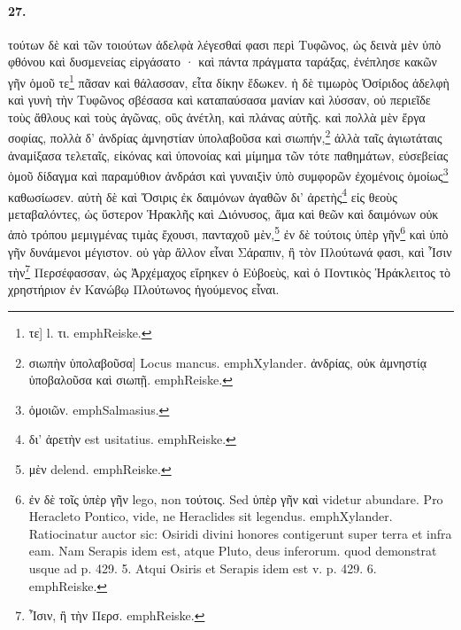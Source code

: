 \documentclass[a4paper, 11pt, oneside, polutonikogreek, german]{article}
\begin{document}
\paragraph{27.}
τούτων δὲ καὶ τῶν τοιούτων ἀδελφὰ λέγεσθαί φασι περὶ Τυφῶνος, ὡς δεινὰ μὲν ὑπὸ φθόνου καὶ δυσμενείας εἰργάσατο · καὶ πάντα πράγματα ταράξας, ἐνέπλησε κακῶν γῆν ὁμοῦ τε\footnote{τε] l. τι. emph{Reiske.}} πᾶσαν καὶ θάλασσαν, εἶτα δίκην ἔδωκεν. ἡ δὲ τιμωρὸς Ὀσίριδος ἀδελφὴ καὶ γυνὴ τὴν Τυφῶνος σβέσασα καὶ καταπαύσασα μανίαν καὶ λύσσαν, οὐ περιεῖδε τοὺς ἄθλους καὶ τοὺς ἀγῶνας, οὓς ἀνέτλη, καὶ πλάνας αὑτῆς. καὶ πολλὰ μὲν ἔργα σοφίας, πολλὰ δ' ἀνδρίας ἀμνηστίαν ὑπολαβοῦσα καὶ σιωπήν,\footnote{σιωπὴν ὑπολαβοῦσα] Locus mancus. emph{Xylander.} ἀνδρίας, οὐκ ἀμνηστίᾳ ὑποβαλοῦσα καὶ σιωπῇ. emph{Reiske.}} ἀλλὰ ταῖς ἁγιωτάταις ἀναμίξασα τελεταῖς, εἰκόνας καὶ ὑπονοίας καὶ μίμημα τῶν τότε παθημάτων, εὐσεβείας ὁμοῦ δίδαγμα καὶ παραμύθιον ἀνδράσι καὶ γυναιξὶν ὑπὸ συμφορῶν ἐχομένοις ὁμοίως\footnote{ὁμοιῶν. emph{Salmasius.}} καθωσίωσεν. αὐτὴ δὲ καὶ Ὄσιρις ἐκ δαιμόνων ἀγαθῶν δι' ἀρετὴς\footnote{δι' ἀρετὴν est usitatius. emph{Reiske.}} εἰς θεοὺς μεταβαλόντες, ὡς ὕστερον Ἡρακλῆς καὶ Διόνυσος, ἅμα καὶ θεῶν καὶ δαιμόνων οὐκ ἀπὸ τρόπου μεμιγμένας τιμὰς ἔχουσι, πανταχοῦ μὲν,\footnote{μὲν delend. emph{Reiske.}} ἐν δὲ τούτοις ὑπὲρ γῆν\footnote{ἐν δὲ τοῖς ὑπὲρ γῆν lego, non τούτοις. Sed ὑπὲρ γῆν καὶ videtur abundare. Pro Heracleto Pontico, vide, ne Heraclides sit legendus. emph{Xylander.} Ratiocinatur auctor sic: Osiridi divini honores contigerunt super terra et infra eam. Nam Serapis idem est, atque Pluto, deus inferorum. quod demonstrat usque ad p. 429. 5. Atqui Osiris et Serapis idem est v. p. 429. 6. emph{Reiske.}} καὶ ὑπὸ γῆν δυνάμενοι μέγιστον. οὐ γὰρ ἄλλον εἶναι Σάραπιν, ἢ τὸν Πλούτωνά φασι, καὶ Ἶσιν τὴν\footnote{Ἶσιν, ἢ τὴν Περσ. emph{Reiske.}} Περσέφασσαν, ὡς Ἀρχέμαχος εἴρηκεν ὁ Εὐβοεὺς, καὶ ὁ Ποντικὸς Ἡράκλειτος τὸ χρηστήριον ἐν Κανώβῳ Πλούτωνος ἡγούμενος εἶναι.
\end{document}
